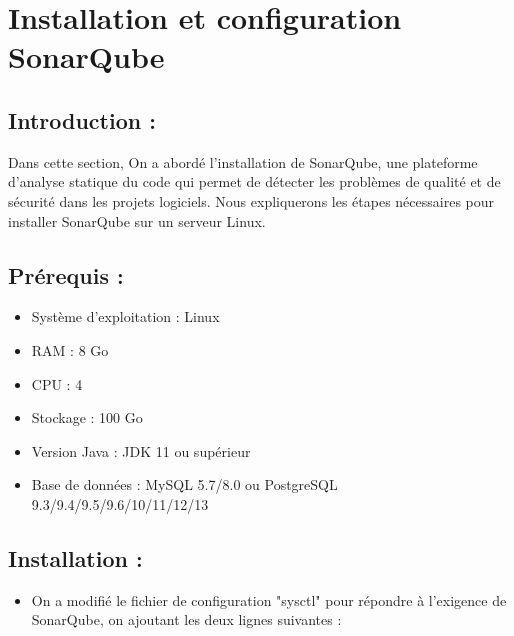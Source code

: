 \section*{Installation et configuration SonarQube}

\subsection*{Introduction :}

Dans cette section, On a abordé l’installation de SonarQube, une plateforme d’analyse statique du code qui permet de détecter les problèmes de qualité et de sécurité dans les projets logiciels. Nous expliquerons les étapes nécessaires pour installer SonarQube sur un serveur Linux.

\subsection*{Prérequis :}

\begin{itemize}
\item Système d’exploitation : Linux
\item RAM : 8 Go
\item CPU : 4
\item Stockage : 100 Go
\item Version Java : JDK 11 ou supérieur
\item Base de données : MySQL 5.7/8.0 ou PostgreSQL 9.3/9.4/9.5/9.6/10/11/12/13
\end{itemize}

\subsection*{Installation :}

\begin{itemize}
\item On a modifié le fichier de configuration "sysctl" pour répondre à l’exigence de SonarQube, on ajoutant les deux lignes suivantes :
\end{itemize}

